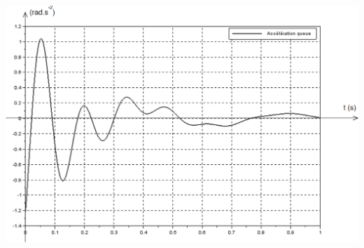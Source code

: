 \documentclass[10pt,fleqn]{article} %
\begin{document}
\begin{multicols}{2}
\begin{center}
\includegraphics[width=\linewidth]{images/fig_06}
\end{center}






\ifprof
\else
\end{multicols}
\fi
\end{document}
